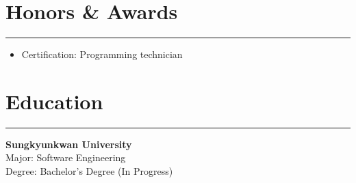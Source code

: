 \documentclass[letterpaper,10pt]{article}
\begin{document}
\section*{Honors \& Awards}
\hrule
\vspace{4pt}

\begin{itemize}
    \item Certification: Programming technician
\end{itemize}

\section*{Education}
\hrule
\vspace{4pt}

\textbf{Sungkyunkwan University} \\
Major: Software Engineering \\
Degree: Bachelor's Degree (In Progress)
\end{document}
